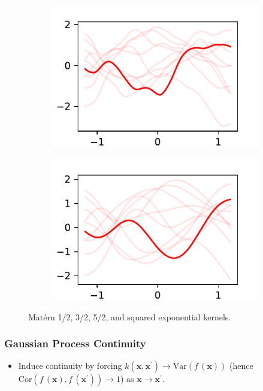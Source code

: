 \documentclass{beamer}
\begin{document}
\begin{frame}
\begin{figure}
\begin{subfigure}[t]{0.4\textwidth}
            \includegraphics[width=\textwidth]{maternfivehalves_kernel.pdf}
        \end{subfigure}%
        \begin{subfigure}[t]{0.4\textwidth}
            \centering
            \includegraphics[width=\textwidth]{exponentiated_kernel.pdf}
        \end{subfigure}%
        \caption{
            Mat\'ern 1/2, 3/2, 5/2, and squared exponential kernels.
        }
    \end{figure}
\end{frame}

\begin{frame}
    \frametitle{Gaussian Process Continuity}
    \begin{itemize}
        \item Induce continuity by forcing
              $k(\mathbf{x}, \mathbf{x}^\prime) \to \mathrm{Var}(f\,(\mathbf{x}))$
              (hence $\mathrm{Cor}(f\,(\mathbf{x}), f\,(\mathbf{x}^\prime)) \to 1$)
              as $\mathbf{x}\to \mathbf{x}^\prime.$
    \end{itemize}
\end{frame}
\end{document}
